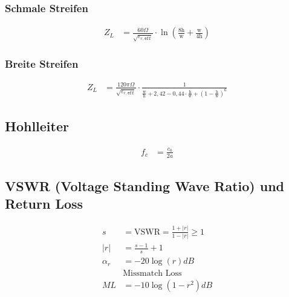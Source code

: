 \subsubsection{Schmale Streifen}
\begin{align*}
    Z_L & = \frac{60\Omega}{\sqrt{\varepsilon_{r,\texttt{eff}}}}\cdot\ln\left(\frac{8\text{h}}{\text{w}}+\frac{\mathrm{w}}{4\mathrm{h}}\right)
\end{align*}
\subsubsection{Breite Streifen}
\begin{align*}
    Z_L & = \frac{120\pi\Omega}{\sqrt{\varepsilon_{r,\texttt{eff}}}}\cdot\frac{1}{\frac{\text{w}}{\text{h}}+2,42-0,44\cdot\frac{\mathrm{h}}{\mathrm{w}}+\left(1-\frac{\mathrm{h}}{\mathrm{w}}\right)^6}
\end{align*}

\subsection{Hohlleiter}
\begin{align*}
    f_c & = \frac{c_0}{2a}
\end{align*}

\subsection{VSWR (Voltage Standing Wave Ratio) und Return Loss}
\begin{align*}
    s        & = \mathrm{VSWR} = \frac{1+|r|}{1-|r|}\geq 1 \\
    |r|      & = \frac{s-1}s+{1}                           \\
    \alpha_r & = -20\log(r)dB                              \\
             & \text{Missmatch Loss}                       \\
    ML       & = -10\log(1-r^2)dB
\end{align*}
